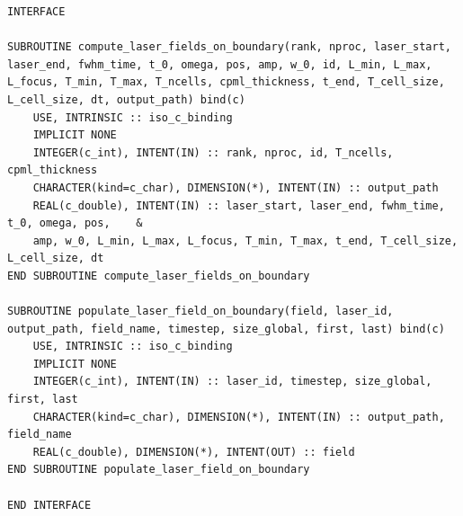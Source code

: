 \begin{lstlisting}[style=FORTRAN, caption=Fortran interfaces for C++ library functions]
INTERFACE

SUBROUTINE compute_laser_fields_on_boundary(rank, nproc, laser_start, laser_end, fwhm_time, t_0, omega, pos, amp, w_0, id, L_min, L_max, L_focus, T_min, T_max, T_ncells, cpml_thickness, t_end, T_cell_size, L_cell_size, dt, output_path) bind(c)
	USE, INTRINSIC :: iso_c_binding
	IMPLICIT NONE
	INTEGER(c_int), INTENT(IN) :: rank, nproc, id, T_ncells, cpml_thickness
	CHARACTER(kind=c_char), DIMENSION(*), INTENT(IN) :: output_path
	REAL(c_double), INTENT(IN) :: laser_start, laser_end, fwhm_time, t_0, omega, pos,    &
	amp, w_0, L_min, L_max, L_focus, T_min, T_max, t_end, T_cell_size, L_cell_size, dt
END SUBROUTINE compute_laser_fields_on_boundary

SUBROUTINE populate_laser_field_on_boundary(field, laser_id, output_path, field_name, timestep, size_global, first, last) bind(c)
	USE, INTRINSIC :: iso_c_binding
	IMPLICIT NONE
	INTEGER(c_int), INTENT(IN) :: laser_id, timestep, size_global, first, last
	CHARACTER(kind=c_char), DIMENSION(*), INTENT(IN) :: output_path, field_name
	REAL(c_double), DIMENSION(*), INTENT(OUT) :: field
END SUBROUTINE populate_laser_field_on_boundary

END INTERFACE
\end{lstlisting}

